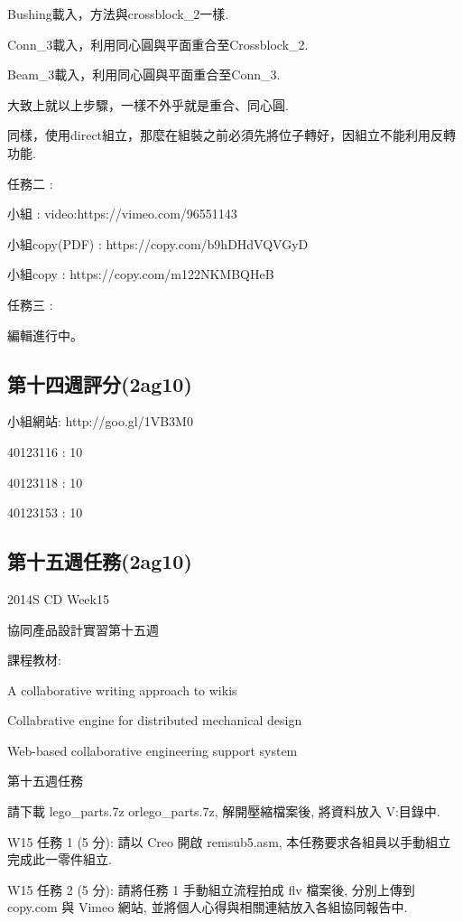 \documentclass[]{article}
\begin{document}
Bushing載入，方法與crossblock\_2一樣.

Conn\_3載入，利用同心圓與平面重合至Crossblock\_2.

Beam\_3載入，利用同心圓與平面重合至Conn\_3.

大致上就以上步驟，一樣不外乎就是重合、同心圓.

同樣，使用direct組立，那麼在組裝之前必須先將位子轉好，因組立不能利用反轉功能.

任務二 :

小組 : video:https://vimeo.com/96551143

小組copy(PDF) : https://copy.com/b9hDHdVQVGyD

小組copy : https://copy.com/m122NKMBQHeB

任務三 :

編輯進行中。

\subsection{第十四週評分(2ag10)}\label{ux7b2cux5341ux56dbux9031ux8a55ux52062ag10}

小組網站: http://goo.gl/1VB3M0

40123116 : 10

40123118 : 10

40123153 : 10

\subsection{第十五週任務(2ag10)}\label{ux7b2cux5341ux4e94ux9031ux4efbux52d92ag10}

2014S CD Week15

協同產品設計實習第十五週

課程教材:

A collaborative writing approach to wikis

Collabrative engine for distributed mechanical design

Web-based collaborative engineering support system

第十五週任務

請下載 lego\_parts.7z orlego\_parts.7z, 解開壓縮檔案後, 將資料放入
V:\home\lego 目錄中.

W15 任務 1 (5 分): 請以 Creo 開啟 remsub5.asm,
本任務要求各組員以手動組立完成此一零件組立.

W15 任務 2 (5 分): 請將任務 1 手動組立流程拍成 flv 檔案後, 分別上傳到
copy.com 與 Vimeo 網站, 並將個人心得與相關連結放入各組協同報告中.
\end{document}
